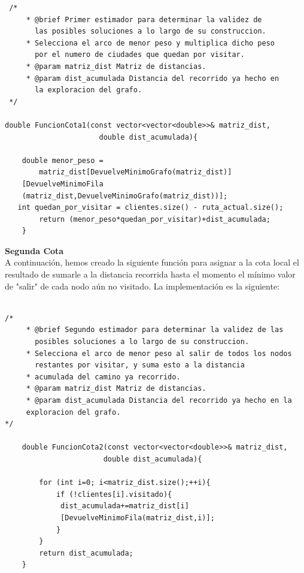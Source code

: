 \documentclass[a4paper,12pt,twoside]{article} %
\begin{document}
\lstset{language=C++}
\begin{lstlisting}
 /*
     * @brief Primer estimador para determinar la validez de 
       las posibles soluciones a lo largo de su construccion.
     * Selecciona el arco de menor peso y multiplica dicho peso 
       por el numero de ciudades que quedan por visitar.
     * @param matriz_dist Matriz de distancias.
     * @param dist_acumulada Distancia del recorrido ya hecho en 
       la exploracion del grafo.
 */

double FuncionCota1(const vector<vector<double>>& matriz_dist,
                      double dist_acumulada){

    double menor_peso =
        matriz_dist[DevuelveMinimoGrafo(matriz_dist)]
    [DevuelveMinimoFila
    (matriz_dist,DevuelveMinimoGrafo(matriz_dist))];
   int quedan_por_visitar = clientes.size() - ruta_actual.size();
        return (menor_peso*quedan_por_visitar)+dist_acumulada;
    }
\end{lstlisting}

\newpage
\textbf{Segunda Cota}\\

 A continuación, hemos creado la siguiente función para asignar a la cota local el resultado de sumarle a la distancia recorrida hasta el momento el mínimo valor de "salir" de cada nodo aún no visitado. La implementación es la siguiente:
 
\lstset{language=C++}
 \begin{lstlisting}

/*
     * @brief Segundo estimador para determinar la validez de las 
       posibles soluciones a lo largo de su construccion.
     * Selecciona el arco de menor peso al salir de todos los nodos
       restantes por visitar, y suma esto a la distancia
     * acumulada del camino ya recorrido.
     * @param matriz_dist Matriz de distancias.
     * @param dist_acumulada Distancia del recorrido ya hecho en la 
     exploracion del grafo.
*/

    double FuncionCota2(const vector<vector<double>>& matriz_dist,
                       double dist_acumulada){

        for (int i=0; i<matriz_dist.size();++i){
            if (!clientes[i].visitado){
             dist_acumulada+=matriz_dist[i]
             [DevuelveMinimoFila(matriz_dist,i)];
            } 
        }
        return dist_acumulada;
    }

\end{lstlisting}
\end{document}
